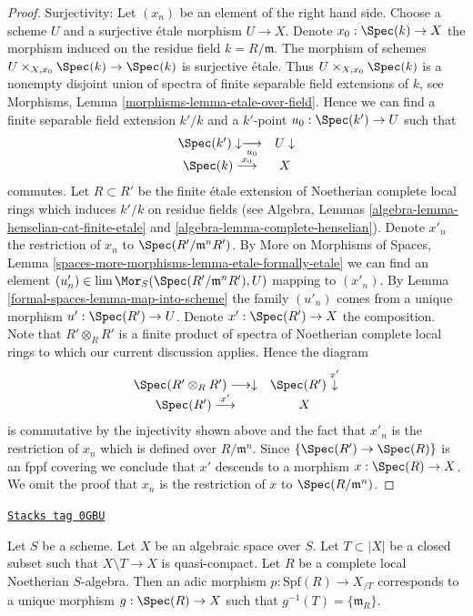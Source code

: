 \begin{proof}
\medskip\noindent
Surjectivity: Let $(x_n)$ be an element of the right hand side.
Choose a scheme $U$ and a surjective \'etale morphism $U \to X$.
Denote $x_0 : \Spec(k) \to X$ the morphism induced on the residue field
$k = R/\mathfrak m$. The morphism of schemes
$U \times_{X, x_0} \Spec(k) \to \Spec(k)$ is surjective \'etale.
Thus $U \times_{X, x_0} \Spec(k)$ is a nonempty disjoint union of spectra
of finite separable field extensions of $k$, see
Morphisms, Lemma \ref{morphisms-lemma-etale-over-field}.
Hence we can find a finite separable field extension $k'/k$
and a $k'$-point $u_0 : \Spec(k') \to U$ such that
$$
\begin{array}{cc}\Spec(k') \downarrow\underset{u_0}{\longrightarrow} & U \downarrow \\ \Spec(k) \overset{x_0}{\longrightarrow} & X\end{array}
$$
commutes. Let $R \subset R'$ be the finite \'etale extension of Noetherian
complete local rings which induces $k'/k$ on residue fields
(see Algebra, Lemmas \ref{algebra-lemma-henselian-cat-finite-etale} and
\ref{algebra-lemma-complete-henselian}). Denote $x'_n$ the restriction
of $x_n$ to $\Spec(R'/\mathfrak m^nR')$. By
More on Morphisms of Spaces, Lemma
\ref{spaces-more-morphisms-lemma-etale-formally-etale}
we can find an element
$(u'_n) \in \lim \Mor_S(\Spec(R'/\mathfrak m^nR'), U)$
mapping to $(x'_n)$. By Lemma \ref{formal-spaces-lemma-map-into-scheme}
the family $(u'_n)$ comes from a unique
morphism $u' : \Spec(R') \to U$. Denote $x' : \Spec(R') \to X$ the
composition. Note that $R' \otimes_R R'$ is a finite product of spectra of
Noetherian complete local rings to which our current discussion applies.
Hence the diagram
$$
\begin{array}{cc}\Spec(R' \otimes_R R') \longrightarrow\downarrow & \Spec(R') \overset{x'}{\downarrow} \\ \Spec(R') \overset{x'}{\longrightarrow} & X\end{array}
$$
is commutative by the injectivity shown above and the fact that
$x'_n$ is the restriction of $x_n$ which is defined over $R/\mathfrak m^n$.
Since $\{\Spec(R') \to \Spec(R)\}$ is an fppf covering we conclude
that $x'$ descends to a morphism $x : \Spec(R) \to X$.
We omit the proof that $x_n$ is the restriction of $x$ to
$\Spec(R/\mathfrak m^n)$.
\end{proof}

\begin{lemma}
\label{formal-spaces-lemma-adic-into-completion}
\href{https://stacks.math.columbia.edu/tag/0GBU}{\texttt{Stacks tag 0GBU}}

Let $S$ be a scheme. Let $X$ be an algebraic space over $S$.
Let $T \subset |X|$ be a closed subset such that
$X \setminus T \to X$ is quasi-compact. Let $R$ be a complete local
Noetherian $S$-algebra. Then an adic morphism $p : \text{Spf}(R) \to X_{/T}$
corresponds to a unique morphism $g : \Spec(R) \to X$ such
that $g^{-1}(T) = \{\mathfrak m_R\}$.
\end{lemma}

